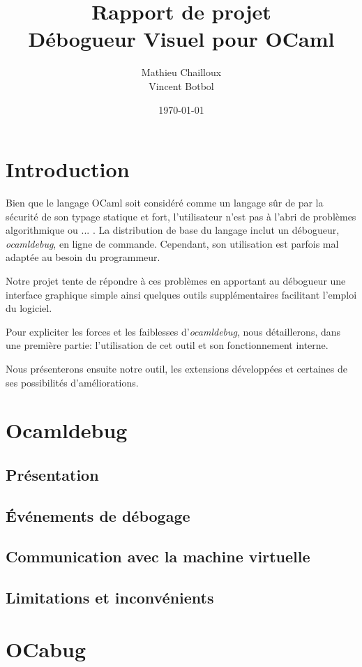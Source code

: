 \documentclass[11pt,a4paper]{report}
\title{Rapport de projet\\Débogueur Visuel pour OCaml}
\author{Mathieu Chailloux\\Vincent Botbol}
\date\today
\begin{document}
\maketitle

\chapter{Introduction}

Bien que le langage OCaml soit considéré comme un langage sûr de par la sécurité de son typage statique et fort,
l'utilisateur n'est pas à l'abri de problèmes algorithmique ou ... . La distribution de base du langage inclut %
un débogueur, \emph{ocamldebug}, en ligne de commande. Cependant, son utilisation est parfois mal adaptée au besoin du programmeur.

Notre projet tente de répondre à ces problèmes en apportant au débogueur une interface graphique simple ainsi quelques
outils supplémentaires facilitant l'emploi du logiciel.

Pour expliciter les forces et les faiblesses d'\emph{ocamldebug}, nous détaillerons, dans une première partie:
l'utilisation de cet outil et son fonctionnement interne.

Nous présenterons ensuite notre outil, les extensions développées et certaines de ses possibilités d'améliorations.

\chapter{Ocamldebug}

\section{Présentation}
\section{\'Evénements de débogage}
\section{Communication avec la machine virtuelle}
\section{Limitations et inconvénients} %


\chapter{OCabug}
\end{document}
